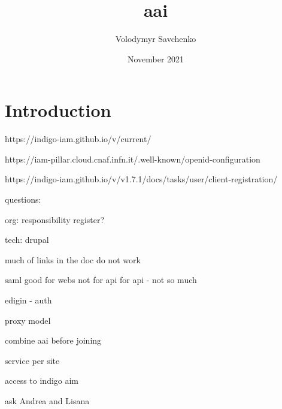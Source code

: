 \documentclass{article}
\title{aai}
\author{Volodymyr Savchenko}
\date{November 2021}
\begin{document}
\maketitle

\section{Introduction}



https://indigo-iam.github.io/v/current/




https://iam-pillar.cloud.cnaf.infn.it/.well-known/openid-configuration


https://indigo-iam.github.io/v/v1.7.1/docs/tasks/user/client-registration/


questions:

org: responsibility
register?

tech: drupal

much of links in the doc do not work

saml good for webs not for api
for api - not so much

edigin - auth

proxy model

combine aai before joining

service per site

access to indigo aim

ask Andrea and Lisana
\end{document}
